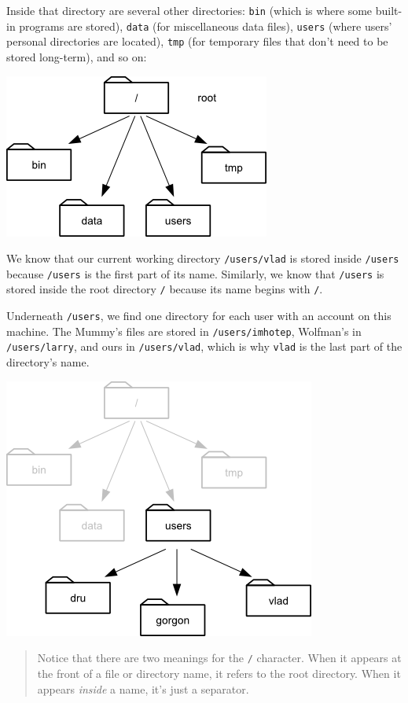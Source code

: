 \documentclass{book}
\begin{document}
Inside that directory are several other directories: \texttt{bin} (which
is where some built-in programs are stored), \texttt{data} (for
miscellaneous data files), \texttt{users} (where users' personal
directories are located), \texttt{tmp} (for temporary files that don't
need to be stored long-term), and so on:

\includegraphics{novice/shell/img/filesystem.png}

We know that our current working directory \texttt{/users/vlad} is
stored inside \texttt{/users} because \texttt{/users} is the first part
of its name. Similarly, we know that \texttt{/users} is stored inside
the root directory \texttt{/} because its name begins with \texttt{/}.

Underneath \texttt{/users}, we find one directory for each user with an
account on this machine. The Mummy's files are stored in
\texttt{/users/imhotep}, Wolfman's in \texttt{/users/larry}, and ours in
\texttt{/users/vlad}, which is why \texttt{vlad} is the last part of the
directory's name.

\includegraphics{novice/shell/img/home-directories.png}

\begin{quote}
Notice that there are two meanings for the \texttt{/} character. When it
appears at the front of a file or directory name, it refers to the root
directory. When it appears \emph{inside} a name, it's just a separator.
\end{quote}
\end{document}
